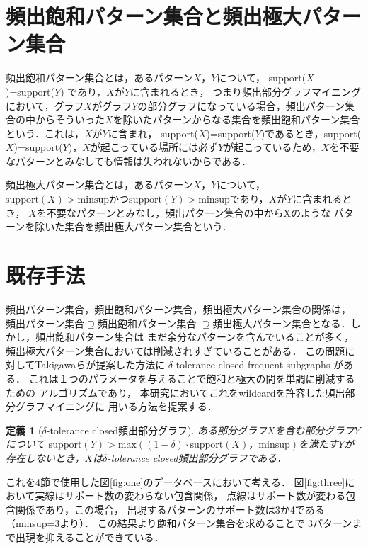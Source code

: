 \documentclass[12pt,fleqn]{jsotsuron}
\newtheorem{Definition}{定義}
\begin{document}
\section{頻出飽和パターン集合と頻出極大パターン集合}

頻出飽和パターン集合とは，あるパターン$X，Y$について，
support($X$)=support($Y$) であり，$X$が$Y$に含まれるとき，
つまり頻出部分グラフマイニングにおいて，グラフ$X$がグラフ$Y$の部分グラフになっている場合，頻出パターン集合の中からそういった$X$を除いたパターンからなる集合を頻出飽和パターン集合という．これは，$X$が$Y$に含まれ，
support($X$)=support($Y$)であるとき，support($X$)=support($Y$)，$X$が起こっている場所には必ず$Y$が起こっているため，$X$を不要なパターンとみなしても情報は失われないからである．

頻出極大パターン集合とは，あるパターン$X，Y$について，
$\mathrm{support}(X) > \mathrm{minsup}$かつ$\mathrm{support}(Y)>\mathrm{minsup}$であり，$X$が$Y$に含まれるとき，
$X$を不要なパターンとみなし，頻出パターン集合の中からXのような
パターンを除いた集合を頻出極大パターン集合という．

\section{既存手法}

頻出パターン集合，頻出飽和パターン集合，頻出極大パターン集合の関係は，
頻出パターン集合$\supseteq$頻出飽和パターン集合
$\supseteq$頻出極大パターン集合となる．しかし，頻出飽和パターン集合は
まだ余分なパターンを含んでいることが多く，
頻出極大パターン集合においては削減されすぎていることがある．
この問題に対してTakigawaらが提案した方法に
$\delta$-tolerance closed frequent subgraphs\cite{deltol} がある．
これは１つのパラメータを与えることで飽和と極大の間を単調に削減するための
アルゴリズムであり，
本研究においてこれをwildcardを許容した頻出部分グラフマイニングに
用いる方法を提案する．

\begin{Definition}[$\delta$-tolerance closed頻出部分グラフ]
ある部分グラフ$X$を含む部分グラフ$Y$について
$\mathrm{support}(Y)>\mathrm{max}((1-\delta)\cdot \mathrm{support}(X)，\mathrm{minsup})$を満たす$Y$が
存在しないとき，$X$は$\delta$-tolerance closed頻出部分グラフである．
\end{Definition}

これを4節で使用した図\ref{fig:one}のデータベースにおいて考える．
図\ref{fig:three}において実線はサポート数の変わらない包含関係，
点線はサポート数が変わる包含関係であり，この場合，
出現するパターンのサポート数は3か4である（minsup=3より）．
この結果より飽和パターン集合を求めることで
3パターンまで出現を抑えることができている．
\end{document}
